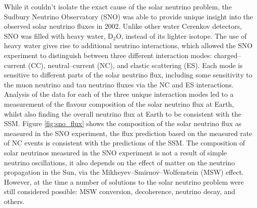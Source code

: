 While it couldn't isolate the exact cause of the solar neutrino problem, the
Sudbury Neutrino Observatory (SNO) was able to provide unique insight into the 
observed solar neutrino fluxes in 2002. Unlike other water Cerenkov detectors, 
SNO was filled with heavy water, \(\mbox{D}_2\mbox{O}\), instead of its 
lighter isotope. The use of heavy water gives rise to additional neutrino 
interactions, which allowed the SNO experiment to distinguish between three 
different interaction modes: charged--current (CC), neutral--current (NC), and 
elastic scattering (ES). Each mode is sensitive to different parts of the 
solar neutrino flux, including some sensitivity to the muon neutrino and tau 
neutrino fluxes via the NC and ES interactions. Analysis of the data for each 
of the three unique interaction modes led to a measurement of the flavour 
composition of the solar neutrino flux at Earth, whilst also finding the 
overall neutrino flux at Earth to be consistent with the SSM. Figure 
\ref{fig:sno_flux} shows the composition of the solar neutrino flux as 
measured in the SNO experiment\cite{Ahmad2002}, the flux prediction based on 
the measured rate of NC events is consistent with the predictions of the SSM. 
The composition of solar neutrinos measured in the SNO experiment is not a 
result of simple neutrino oscillations, it also depends on the effect of matter 
on the neutrino propagation in the Sun, via the Mikheyev–Smirnov–Wolfenstein 
(MSW) effect. However, at the time a number of solutions to the solar neutrino
problem were still considered possible: MSW conversion, decoherence, neutrino 
decay, and others\cite{Smirnov:2016xzf}. 


